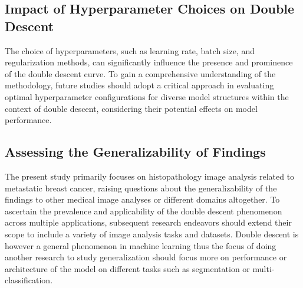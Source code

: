 \subsection{Impact of Hyperparameter Choices on Double Descent}
The choice of hyperparameters, such as learning rate, batch size, and regularization methods, can significantly influence the presence and prominence of the double descent curve. To gain a comprehensive understanding of the methodology, future studies should adopt a critical approach in evaluating optimal hyperparameter configurations for diverse model structures within the context of double descent, considering their potential effects on model performance.

\subsection{Assessing the Generalizability of Findings}
The present study primarily focuses on histopathology image analysis related to metastatic breast cancer, raising questions about the generalizability of the findings to other medical image analyses or different domains altogether. To ascertain the prevalence and applicability of the double descent phenomenon across multiple applications, subsequent research endeavors should extend their scope to include a variety of image analysis tasks and datasets. Double descent is however a general phenomenon in machine learning thus the focus of doing another research to study generalization should focus more on performance or architecture of the model on different tasks such as segmentation or multi-classification.

